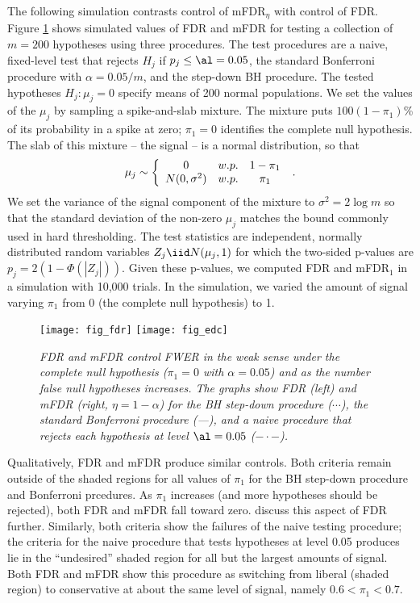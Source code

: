 \documentclass[12pt]{article}
\begin{document}
The following simulation  contrasts control of mFDR$_{\eta}$ with control of FDR.  
Figure \ref{fi:sim1} shows simulated values of FDR and
 mFDR for testing a collection of $m=200$ hypotheses using three
 procedures.  The test procedures are a naive, fixed-level test that rejects $H_j$ if $p_j \le  \al=0.05$, the standard Bonferroni procedure with $\alpha = 0.05/m$, and the step-down BH procedure.  The tested hypotheses $H_j: \mu_j = 0$ specify means
 of 200 normal populations.  We set the values of the $\mu_j$ by
 sampling a spike-and-slab mixture.  The mixture puts $100(1-\pi_1)$\%
 of its probability in a spike at zero; $\pi_1=0$ identifies the
complete null
 hypothesis.  The slab of this mixture -- the signal -- is a normal
 distribution, so that
\begin{equation}
   \mu_j \sim \left\{  \begin{array}{ccc}
                   0  &  w.p.  & 1-\pi_1 \cr
                   N(0,\sigma^2) & w.p. & \pi_1 
    \end{array} \right.  \;.
\label{eq:mu-j}
\end{equation}
We set the variance of the signal component of the mixture to
$\sigma^2 = 2 \log m$ so that the standard deviation of the non-zero
$\mu_j$ matches the bound commonly used in hard thresholding.  The
test statistics are independent, normally distributed random variables
$Z_j \iid N(\mu_j,1)$ for which the two-sided p-values are $p_j =
2(1-\Phi(|Z_j|))$.  Given these p-values, we computed FDR and
mFDR$_{1}$ in a simulation with 10,000 trials.  In the
simulation, we varied the amount of signal varying $\pi_1$ from 0 (the
complete null hypothesis) to 1.

\begin{figure}
\caption{\label{fi:sim1} \sl
FDR  and mFDR control FWER in the weak sense under the complete null hypothesis ($\pi_1=0$ with $\alpha = 0.05$) and as the number false null hypotheses increases.  The graphs show FDR (left) and mFDR (right,  $\eta = 1-\alpha$) for the
BH step-down procedure ($\cdots$), the standard Bonferroni procedure (---), 
and a naive procedure that rejects each hypothesis at level $\al=0.05$
($- \cdot -$).}

\vspace*{0.05in}
\centerline{ 
            \texttt{[image: fig\_fdr]}
            \texttt{[image: fig\_edc]} 
           }

\end{figure}


Qualitatively, FDR and mFDR produce similar controls.  Both
criteria remain outside of the shaded regions for all values
 of $\pi_1$ for the BH step-down procedure and Bonferroni prcedures.   As $\pi_1$
 increases (and more hypotheses should be rejected), both FDR and mFDR fall toward zero.  \cite{shaffer03}
 discuss this aspect of FDR further.  Similarly, both criteria show the failures of the naive testing procedure; the criteria for the naive procedure that tests hypotheses at level 0.05 produces lie in the ``undesired''
 shaded region for all but the largest amounts of signal.  Both FDR and mFDR show
 this procedure as switching from liberal (shaded region) to
 conservative at about the same level of signal, namely $0.6 < \pi_1 <
 0.7$.   
\end{document}
